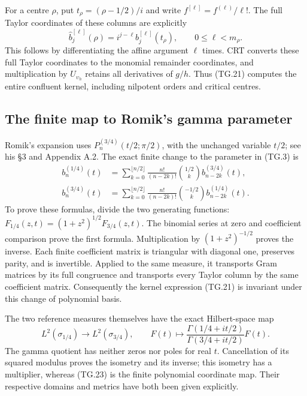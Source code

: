 \documentclass[11pt,a4paper]{article}
\begin{document}
For a centre \(\rho\), put \(t_\rho=(\rho-1/2)/i\) and
write \(f^{[\ell]}=f^{(\ell)}/\ell!\).  The full Taylor
coordinates of these columns are explicitly
\[
 \widehat b_j^{[\ell]}(\rho)
     =i^{j-\ell}b_j^{[\ell]}(t_\rho),
                 \qquad 0\leq\ell<m_\rho.
                                                               \tag{TG.22}
\]
This follows by differentiating the affine argument \(\ell\)
times.  CRT converts these full Taylor coordinates to the monomial
remainder coordinates, and multiplication by
\(U_{\upsilon_h}\) retains all derivatives of \(g/h\).  Thus
(TG.21) computes the entire confluent kernel, including nilpotent
orders and critical centres.

\subsection{The finite map to Romik's gamma parameter}

Romik's expansion uses \(P_n^{(3/4)}(t/2;\pi/2)\), with the
unchanged variable \(t/2\); see his \S3 and Appendix A.2.
The exact finite change to the parameter in (TG.3) is
\[
 \begin{aligned}
 b_n^{(1/4)}(t)
   &=\sum_{k=0}^{\lfloor n/2\rfloor}
       \frac{n!}{(n-2k)!}\binom{1/2}{k}
                       b_{n-2k}^{(3/4)}(t),\\
 b_n^{(3/4)}(t)
   &=\sum_{k=0}^{\lfloor n/2\rfloor}
       \frac{n!}{(n-2k)!}\binom{-1/2}{k}
                       b_{n-2k}^{(1/4)}(t).
 \end{aligned}                                                    \tag{TG.23}
\]
To prove these formulas, divide the two generating functions:
\(F_{1/4}(z,t)=(1+z^2)^{1/2}F_{3/4}(z,t)\).
The binomial series at zero and coefficient comparison prove the
first formula.  Multiplication by \((1+z^2)^{-1/2}\) proves the
inverse.  Each finite coefficient matrix is triangular with diagonal
one, preserves parity, and is invertible.  Applied to the same
measure, it transports Gram matrices by its full congruence and
transports every Taylor column by the same coefficient matrix.
Consequently the kernel expression (TG.21) is invariant under this
change of polynomial basis.

The two reference measures themselves have the exact Hilbert-space
map
\[
 L^2(\sigma_{1/4})\longrightarrow L^2(\sigma_{3/4}),
 \qquad F(t)\longmapsto
        \frac{\Gamma(1/4+it/2)}{\Gamma(3/4+it/2)}F(t).
                                                               \tag{TG.24}
\]
The gamma quotient has neither zeros nor poles for real \(t\).
Cancellation of its squared modulus proves the isometry and its
inverse; this isometry has a multiplier, whereas (TG.23) is the
finite polynomial coordinate map.  Their respective domains and
metrics have both been given explicitly.
\end{document}
